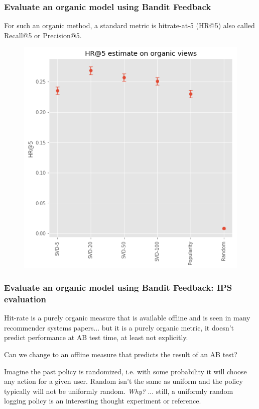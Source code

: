 \begin{frame}
  \frametitle{Evaluate an organic model using Bandit Feedback}

  For such an organic method, a standard metric is hitrate-at-5 (HR@5) also called Recall@5 or Precision@5.
\begin{figure}[h!]
\includegraphics[scale=0.4]{images/evalorganicwithbandit2.png}
\centering
\label{motex1}
\end{figure}
\end{frame}

\begin{frame}
  \frametitle{Evaluate an organic model using Bandit Feedback: IPS evaluation}

Hit-rate is a purely organic measure that is available offline and is seen in many recommender systems papers...  \pause but it is a purely organic metric, it doesn't predict performance at AB test time, at least not explicitly.

\pause

Can we change to an offline measure that predicts the result of an AB test?

\pause

Imagine the past policy is randomized, i.e. with some probability it will choose any action for a given user.  \pause Random isn't the same as uniform and the policy typically will not be uniformly random. \pause \emph{Why?} \pause ... still, a uniformly random logging policy is an interesting thought experiment or reference.

\end{frame}

